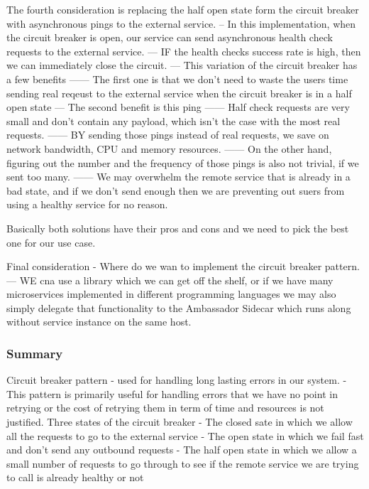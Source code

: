 \documentclass[a4paper, 11pt]{book}
\begin{document}
    The fourth consideration is replacing the half open state form the circuit breaker with asynchronous pings to the external service.
    -- In this implementation, when the circuit breaker is open, our service can send asynchronous health check requests to the external service.
    --- IF the health checks success rate is high, then we can immediately close the circuit.
    --- This variation of the circuit breaker has a few benefits
    ------ The first one is that we don't need to waste the users time sending real reqeust to the external service when the circuit breaker is in a half open state
    --- The second benefit is this ping
    ------ Half check requests are very small and don't contain any payload, which isn't the case with the most real requests.
    ------ BY sending those pings instead of real requests, we save on network bandwidth, CPU and memory resources.
    ------ On the other hand, figuring out the number and the frequency of those pings is also not trivial, if we sent too many.
    ------ We may overwhelm the remote service that is already in a bad state, and if we don't send enough then we are preventing out suers from using a healthy service for no reason.

    Basically both solutions have their pros and cons and we need to pick the best one for our use case.

    Final consideration - Where do we wan to implement the circuit breaker pattern.
    --- WE cna use a library which we can get off the shelf, or if we have many microservices implemented in different programming languages we may also simply delegate that functionality to the Ambassador Sidecar which runs along without service instance on the same host.

    \subsubsection{Summary}
    Circuit breaker pattern - used for handling long lasting errors in our system.
    - This pattern is primarily useful for handling errors that we have no point in retrying or the cost of retrying them in term of time and resources is not justified.
    Three states of the circuit breaker
    - The closed sate in which we allow all the requests to go to the external service
    - The open state in which we fail fast and don't send any outbound requests
    - The half open state in which we allow a small number of requests to go through to see if the remote service we are trying to call is already healthy or not
\end{document}
